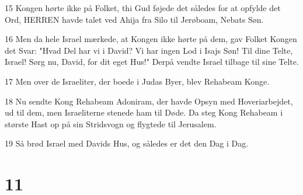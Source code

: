 \par 15 Kongen hørte ikke på Folket, thi Gud føjede det således for at opfylde det Ord, HERREN havde talet ved Ahija fra Silo til Jerøboam, Nebats Søn.
\par 16 Men da hele Israel mærkede, at Kongen ikke hørte på dem, gav Folket Kongen det Svar: "Hvad Del har vi i David? Vi har ingen Lod i Isajs Søn! Til dine Telte, Israel! Sørg nu, David, for dit eget Hus!" Derpå vendte Israel tilbage til sine Telte.
\par 17 Men over de Israeliter, der boede i Judas Byer, blev Rehabeam Konge.
\par 18 Nu sendte Kong Rehabeam Adoniram, der havde Opsyn med Hoveriarbejdet, ud til dem, men Israeliterne stenede ham til Døde. Da steg Kong Rehabeam i største Hast op på sin Stridsvogn og flygtede til Jerusalem.
\par 19 Så brød Israel med Davids Hus, og således er det den Dag i Dag.

\chapter{11}

